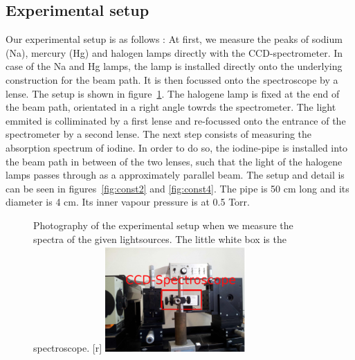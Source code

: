 \subsection{Experimental setup}
Our experimental setup is as follows \cite{versuchsanleitung}:
At first, we measure the peaks of sodium (Na), 
mercury (Hg) and halogen lamps directly with the CCD-spectrometer. 
In case of the Na and Hg lamps, the lamp is installed directly onto 
the underlying construction for the beam path. 
It is then focussed onto the spectroscope by a lense. 
The setup is shown in figure~\ref{fig:const1}.
The halogene lamp is fixed at the end of the beam path, orientated 
in a right angle towrds the spectrometer. The light emmited is 
colliminated by a first lense and re-focussed onto the entrance of 
the spectrometer by a second lense. 
The next step consists of measuring the absorption spectrum 
of iodine. In order to do so, the iodine-pipe is installed 
into the beam path in between of the two lenses, such that 
the light of the halogene lamps passes through as a approximately 
parallel beam. The setup and detail is can be seen in 
figures~\ref{fig:const2} and \ref{fig:const4}.
The pipe is 50 cm long and its diameter is 4 cm. Its inner 
vapour pressure is at 0.5 Torr.

\begin{figure}[!t]
    \begin{captionbeside}[]{
        Photography of the experimental setup when 
        we measure the spectra of the given lightsources. 
        The little white box is the spectroscope.
        }[r]
        \includegraphics[width=0.48\textwidth]{pics/const1}
    \end{captionbeside}
    \label{fig:const1}
\end{figure}

